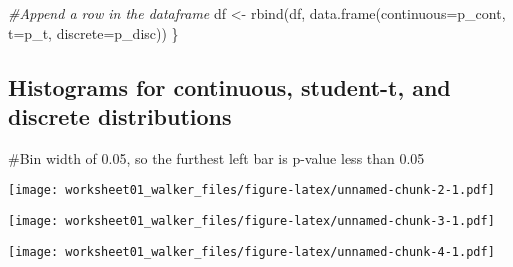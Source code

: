 \documentclass[
]{article}
\newenvironment{Shaded}{\begin{snugshade}}{\end{snugshade}}
\newcommand{\AttributeTok}[1]{\textcolor[rgb]{0.77,0.63,0.00}{#1}}
\newcommand{\CommentTok}[1]{\textcolor[rgb]{0.56,0.35,0.01}{\textit{#1}}}
\newcommand{\FloatTok}[1]{\textcolor[rgb]{0.00,0.00,0.81}{#1}}
\newcommand{\FunctionTok}[1]{\textcolor[rgb]{0.00,0.00,0.00}{#1}}
\newcommand{\NormalTok}[1]{#1}
\newcommand{\OtherTok}[1]{\textcolor[rgb]{0.56,0.35,0.01}{#1}}
\newcommand{\SpecialCharTok}[1]{\textcolor[rgb]{0.00,0.00,0.00}{#1}}
\begin{document}
\begin{Shaded}
\begin{Highlighting}[]
  \CommentTok{\#Append a row in the dataframe}
\NormalTok{  df }\OtherTok{\textless{}{-}} \FunctionTok{rbind}\NormalTok{(df, }\FunctionTok{data.frame}\NormalTok{(}\AttributeTok{continuous=}\NormalTok{p\_cont, }\AttributeTok{t=}\NormalTok{p\_t, }\AttributeTok{discrete=}\NormalTok{p\_disc))}
\NormalTok{\}}
\end{Highlighting}
\end{Shaded}

\hypertarget{histograms-for-continuous-student-t-and-discrete-distributions}{%
\subsection{Histograms for continuous, student-t, and discrete
distributions}\label{histograms-for-continuous-student-t-and-discrete-distributions}}

\#Bin width of 0.05, so the furthest left bar is p-value less than 0.05

\begin{Shaded}
\end{Shaded}

\texttt{[image: worksheet01\_walker\_files/figure-latex/unnamed-chunk-2-1.pdf]}

\begin{Shaded}
\end{Shaded}

\texttt{[image: worksheet01\_walker\_files/figure-latex/unnamed-chunk-3-1.pdf]}

\begin{Shaded}
\end{Shaded}

\texttt{[image: worksheet01\_walker\_files/figure-latex/unnamed-chunk-4-1.pdf]}

\begin{Shaded}
\end{Shaded}
\end{document}
